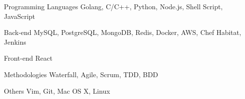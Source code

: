 

\begin{cvskills}

  \cvskill
    {Programming Languages}
    {Golang, C/C++, Python, Node.js, Shell Script, JavaScript}

  \cvskill
    {Back-end}
    {MySQL, PostgreSQL, MongoDB, Redis, Docker, AWS, Chef Habitat, Jenkins}

  \cvskill
    {Front-end}
    {React}

  \cvskill
    {Methodologies}
    {Waterfall, Agile, Scrum, TDD, BDD}

  \cvskill
    {Others}
    {Vim, Git, Mac OS X, Linux}

\end{cvskills}
